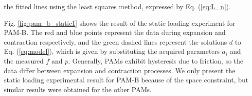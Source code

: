 \noindent the fitted lines using the least squares method, expressed by Eq. (\ref{eq:L_n}).

Fig. \ref{fig:pam_b_static1} shows the result of the static loading experiment for PAM-B. The red and blue points represent the data during expansion and contraction respectively, and the green dashed lines represent the solutions $d$ to Eq. (\ref{eq:model}), which is given by substituting the acquired parameters $a_i$ and the measured $f$ and $p$.
Generally, PAMs exhibit hysteresis due to friction, so the data differ between expansion and contraction processes. We only present the static loading experimental result for PAM-B because of the space constraint, but similar results were obtained for the other PAMs.









